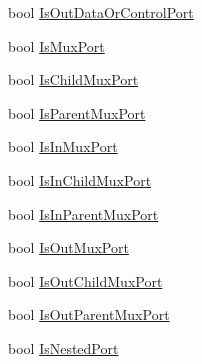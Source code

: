 \begin{DoxyCompactItemize}
\item 
bool \hyperlink{classi_c_s___editor_object_a78b1d5bbc3029b73607e403d412b09b6}{Is\+Out\+Data\+Or\+Control\+Port}
\item 
bool \hyperlink{classi_c_s___editor_object_abd6a963f4c9ae7728d4cd16b61360ace}{Is\+Mux\+Port}
\item 
bool \hyperlink{classi_c_s___editor_object_af46d9038298f6558b89a8a11ad0d6985}{Is\+Child\+Mux\+Port}
\item 
bool \hyperlink{classi_c_s___editor_object_a9e197b013a5d84b3d804e6b41b49b457}{Is\+Parent\+Mux\+Port}
\item 
bool \hyperlink{classi_c_s___editor_object_aa0fe0596710c195bc4f8ec0bc0d9756f}{Is\+In\+Mux\+Port}
\item 
bool \hyperlink{classi_c_s___editor_object_afe1b233c9268cd8d347357185dc533c4}{Is\+In\+Child\+Mux\+Port}
\item 
bool \hyperlink{classi_c_s___editor_object_a41f6753ecda44f9d7c19e38be755954f}{Is\+In\+Parent\+Mux\+Port}
\item 
bool \hyperlink{classi_c_s___editor_object_a4f1ff9e8a20f8966a814091ef3abca03}{Is\+Out\+Mux\+Port}
\item 
bool \hyperlink{classi_c_s___editor_object_ac5ee4608221189ee1d6eb35ca37ab734}{Is\+Out\+Child\+Mux\+Port}
\item 
bool \hyperlink{classi_c_s___editor_object_aea5704e8d2aef51e371754ca24ddc05d}{Is\+Out\+Parent\+Mux\+Port}
\item 
bool \hyperlink{classi_c_s___editor_object_ad8423e67718b5f42844dabe6231e5b4e}{Is\+Nested\+Port}
\item 

\end{DoxyCompactItemize}
